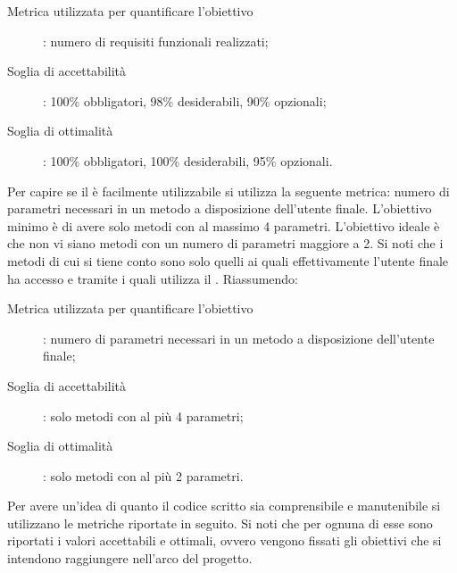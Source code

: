 					\begin{description}
						\item[Metrica utilizzata per quantificare l'obiettivo]: numero di requisiti funzionali realizzati;
						\item[Soglia di accettabilità]: 100\% obbligatori, 98\% desiderabili, 90\% opzionali;
						\item[Soglia di ottimalità]: 100\% obbligatori, 100\% desiderabili, 95\% opzionali.
					\end{description}
					Per capire se il  è facilmente utilizzabile si utilizza la seguente metrica: numero di parametri necessari in un metodo a disposizione dell'utente finale. L'obiettivo minimo è di avere solo metodi con al massimo 4 parametri. L'obiettivo ideale è che non vi siano metodi con un numero di parametri maggiore a 2. Si noti che i metodi di cui si tiene conto sono solo quelli ai quali effettivamente l'utente finale ha accesso e tramite i quali utilizza il . Riassumendo:
					\begin{description}
						\item[Metrica utilizzata per quantificare l'obiettivo]: numero di parametri necessari in un metodo a disposizione dell'utente finale;
						\item[Soglia di accettabilità]: solo metodi con al più 4 parametri;
						\item[Soglia di ottimalità]: solo metodi con al più 2 parametri.
					\end{description}
					Per avere un'idea di quanto il codice scritto sia comprensibile e manutenibile si utilizzano le metriche riportate in seguito. Si noti che per ognuna di esse sono riportati i valori accettabili e ottimali, ovvero vengono fissati gli obiettivi che si intendono raggiungere nell'arco del progetto.
